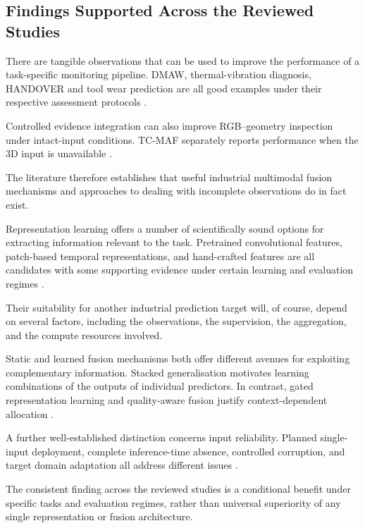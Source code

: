 \subsection{Findings Supported Across the Reviewed Studies}

There are tangible observations that can be used to improve the performance of a task-specific
monitoring pipeline. DMAW, thermal-vibration diagnosis, HANDOVER and tool wear prediction are all
good examples under their respective assessment protocols
\parencite{fan_dmaw_2026,huo_multisensor_2022,thoduka_multimodal_2024,zhang_tool_2026}.

Controlled evidence integration can also improve RGB--geometry inspection under intact-input
conditions. TC-MAF separately reports performance when the 3D input is unavailable \parencite{deng_tc-maf_2026}.

The literature therefore establishes that useful industrial multimodal fusion mechanisms and
approaches to dealing with incomplete observations do in fact exist.

Representation learning offers a number of scientifically sound options for extracting information
relevant to the task. Pretrained convolutional features, patch-based temporal representations, and
hand-crafted features are all candidates with some supporting evidence under certain learning and
evaluation regimes \parencite{roth_towards_2022,nie_time_2023,horwitz_back_2023}.

Their suitability for another industrial prediction target will, of course, depend on several
factors, including the observations, the supervision, the aggregation, and the compute resources
involved.

Static and learned fusion mechanisms both offer different avenues for exploiting complementary
information. Stacked generalisation motivates learning combinations of the outputs of individual
predictors. In contrast, gated representation learning and quality-aware fusion justify
context-dependent allocation \parencite{ting_issues_1999,arevalo_gated_2017,zhang_provable_2023}.

A further well-established distinction concerns input reliability. Planned single-input deployment,
complete inference-time absence, controlled corruption, and target domain adaptation all address
different issues \parencite{li_pgmtkd_2025,altinses_deep_2023,zhao_realtime_2026}.

The consistent finding across the reviewed studies is a conditional benefit under specific tasks and
evaluation regimes, rather than universal superiority of any single representation or fusion
architecture.

